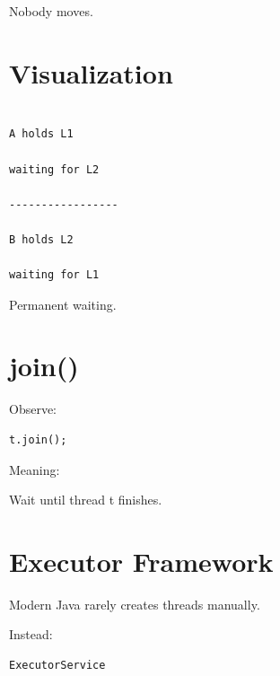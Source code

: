 \documentclass[11pt,a4paper]{book}
\begin{document}

Nobody moves.


\section{Visualization}

\begin{verbatim}

A holds L1

waiting for L2

-----------------

B holds L2

waiting for L1

\end{verbatim}


Permanent waiting.


\section{join()}

Observe:

\begin{verbatim} 
t.join();
\end{verbatim}


Meaning:


Wait until thread t finishes.


\section{Executor Framework}

Modern Java rarely creates
threads manually.


Instead:

\begin{verbatim} 
ExecutorService
\end{verbatim}
\end{document}
